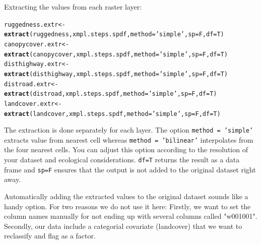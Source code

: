 \documentclass[11pt, a4paper]{article}\usepackage[]{graphicx}\usepackage[]{color}
\makeatletter
\newcommand{\hlstr}[1]{\textcolor[rgb]{0.192,0.494,0.8}{#1}}%
\newcommand{\hlstd}[1]{\textcolor[rgb]{0.345,0.345,0.345}{#1}}%
\newcommand{\hlkwb}[1]{\textcolor[rgb]{0.69,0.353,0.396}{#1}}%
\newcommand{\hlkwc}[1]{\textcolor[rgb]{0.333,0.667,0.333}{#1}}%
\newcommand{\hlkwd}[1]{\textcolor[rgb]{0.737,0.353,0.396}{\textbf{#1}}}%
\newenvironment{kframe}{%
 \def\at@end@of@kframe{}%
 \ifinner\ifhmode%
  \def\at@end@of@kframe{\end{minipage}}%
  \begin{minipage}{\columnwidth}%
 \fi\fi%
 \def\FrameCommand##1{\hskip\@totalleftmargin \hskip-\fboxsep
 \colorbox{shadecolor}{##1}\hskip-\fboxsep
     \hskip-\linewidth \hskip-\@totalleftmargin \hskip\columnwidth}%
 \MakeFramed {\advance\hsize-\width
   \@totalleftmargin\z@ \linewidth\hsize
   \@setminipage}}%
 {\par\unskip\endMakeFramed%
 \at@end@of@kframe}
\newenvironment{knitrout}{}{} %
\makeatother
\begin{document}
Extracting the values from each raster layer:
\begin{knitrout}
\color{fgcolor}\begin{kframe}
\begin{alltt}
\hlstd{ruggedness.extr} \hlkwb{<-} \hlkwd{extract}\hlstd{(ruggedness, xmpl.steps.spdf,} \hlkwc{method}\hlstd{=}\hlstr{'simple'}\hlstd{,} \hlkwc{sp}\hlstd{=F,} \hlkwc{df}\hlstd{=T)}
\hlstd{canopycover.extr} \hlkwb{<-} \hlkwd{extract}\hlstd{(canopycover, xmpl.steps.spdf,} \hlkwc{method}\hlstd{=}\hlstr{'simple'}\hlstd{,} \hlkwc{sp}\hlstd{=F,} \hlkwc{df}\hlstd{=T)}
\hlstd{disthighway.extr} \hlkwb{<-} \hlkwd{extract}\hlstd{(disthighway, xmpl.steps.spdf,} \hlkwc{method}\hlstd{=}\hlstr{'simple'}\hlstd{,} \hlkwc{sp}\hlstd{=F,} \hlkwc{df}\hlstd{=T)}
\hlstd{distroad.extr} \hlkwb{<-} \hlkwd{extract}\hlstd{(distroad, xmpl.steps.spdf,} \hlkwc{method}\hlstd{=}\hlstr{'simple'}\hlstd{,} \hlkwc{sp}\hlstd{=F,} \hlkwc{df}\hlstd{=T)}
\hlstd{landcover.extr} \hlkwb{<-} \hlkwd{extract}\hlstd{(landcover, xmpl.steps.spdf,} \hlkwc{method}\hlstd{=}\hlstr{'simple'}\hlstd{,} \hlkwc{sp}\hlstd{=F,} \hlkwc{df}\hlstd{=T)}
\end{alltt}
\end{kframe}
\end{knitrout}
The extraction is done separately for each layer. The option \texttt{method = 'simple'} extracts value from nearest cell whereas \texttt{method = 'bilinear'} interpolates from the four nearest cells. You can adjust this option according to the resolution of your dataset and ecological considerations. \texttt{df=T} returns the result as a data frame and \texttt{sp=F} ensures that the output is not added to the original dataset right away. 

Automatically adding the extracted values to the original dataset sounds like a handy option. For two reasons we do not use it here: Firstly, we want to set the column names manually for not ending up with several columns called "w001001". Secondly, our data include a categorial covariate (landcover) that we want to reclassify and flag as a factor.
\end{document}
